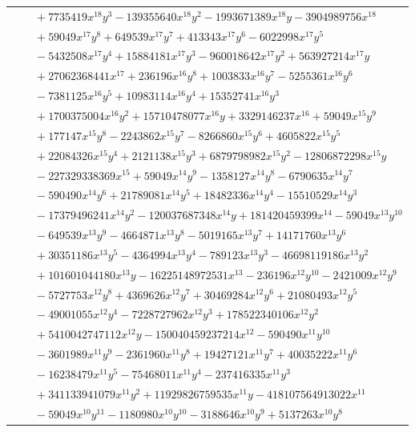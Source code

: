 \documentclass[11pt]{article}
\begin{document}
\begin{longtable}{@{}ll@{}}
 & $\quad +7735419x^{18}y^{3}-139355640x^{18}y^{2}-1993671389x^{18}y-3904989756x^{18}$\\
 & $\quad +59049x^{17}y^{8}+649539x^{17}y^{7}+413343x^{17}y^{6}-6022998x^{17}y^{5}$\\
 & $\quad -5432508x^{17}y^{4}+15884181x^{17}y^{3}-960018642x^{17}y^{2}+563927214x^{17}y$\\
 & $\quad +27062368441x^{17}+236196x^{16}y^{8}+1003833x^{16}y^{7}-5255361x^{16}y^{6}$\\
 & $\quad -7381125x^{16}y^{5}+10983114x^{16}y^{4}+15352741x^{16}y^{3}$\\
 & $\quad +1700375004x^{16}y^{2}+15710478077x^{16}y+3329146237x^{16}+59049x^{15}y^{9}$\\
 & $\quad +177147x^{15}y^{8}-2243862x^{15}y^{7}-8266860x^{15}y^{6}+4605822x^{15}y^{5}$\\
 & $\quad +22084326x^{15}y^{4}+2121138x^{15}y^{3}+6879798982x^{15}y^{2}-12806872298x^{15}y$\\
 & $\quad -227329338369x^{15}+59049x^{14}y^{9}-1358127x^{14}y^{8}-6790635x^{14}y^{7}$\\
 & $\quad -590490x^{14}y^{6}+21789081x^{14}y^{5}+18482336x^{14}y^{4}-15510529x^{14}y^{3}$\\
 & $\quad -17379496241x^{14}y^{2}-120037687348x^{14}y+181420459399x^{14}-59049x^{13}y^{10}$\\
 & $\quad -649539x^{13}y^{9}-4664871x^{13}y^{8}-5019165x^{13}y^{7}+14171760x^{13}y^{6}$\\
 & $\quad +30351186x^{13}y^{5}-4364994x^{13}y^{4}-789123x^{13}y^{3}-46698119186x^{13}y^{2}$\\
 & $\quad +101601044180x^{13}y-16225148972531x^{13}-236196x^{12}y^{10}-2421009x^{12}y^{9}$\\
 & $\quad -5727753x^{12}y^{8}+4369626x^{12}y^{7}+30469284x^{12}y^{6}+21080493x^{12}y^{5}$\\
 & $\quad -49001055x^{12}y^{4}-7228727962x^{12}y^{3}+178522340106x^{12}y^{2}$\\
 & $\quad +5410042747112x^{12}y-150040459237214x^{12}-590490x^{11}y^{10}$\\
 & $\quad -3601989x^{11}y^{9}-2361960x^{11}y^{8}+19427121x^{11}y^{7}+40035222x^{11}y^{6}$\\
 & $\quad -16238479x^{11}y^{5}-75468011x^{11}y^{4}-237416335x^{11}y^{3}$\\
 & $\quad +341133941079x^{11}y^{2}+11929826759535x^{11}y-418107564913022x^{11}$\\
 & $\quad -59049x^{10}y^{11}-1180980x^{10}y^{10}-3188646x^{10}y^{9}+5137263x^{10}y^{8}$\\

\end{longtable}
\end{document}
